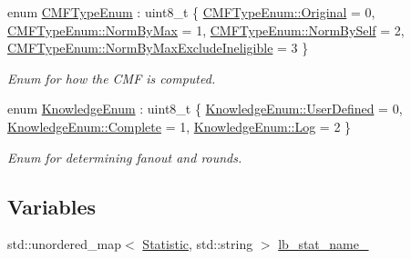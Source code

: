 \begin{DoxyCompactItemize}
enum \hyperlink{namespacevt_1_1vrt_1_1collection_1_1lb_ada1e381e6b19ba9f8277d4f698445404}{C\+M\+F\+Type\+Enum} \+: uint8\+\_\+t \{ \hyperlink{namespacevt_1_1vrt_1_1collection_1_1lb_ada1e381e6b19ba9f8277d4f698445404a0a52da7a03a6de3beefe54f8c03ad80d}{C\+M\+F\+Type\+Enum\+::\+Original} = 0, 
\hyperlink{namespacevt_1_1vrt_1_1collection_1_1lb_ada1e381e6b19ba9f8277d4f698445404a2a17cd13e37fb3cacfea703c5edc3680}{C\+M\+F\+Type\+Enum\+::\+Norm\+By\+Max} = 1, 
\hyperlink{namespacevt_1_1vrt_1_1collection_1_1lb_ada1e381e6b19ba9f8277d4f698445404a538edd88c8c3085ee0ee4337f25bc296}{C\+M\+F\+Type\+Enum\+::\+Norm\+By\+Self} = 2, 
\hyperlink{namespacevt_1_1vrt_1_1collection_1_1lb_ada1e381e6b19ba9f8277d4f698445404abaf94565ded5ad030ec19a9c5ab07d95}{C\+M\+F\+Type\+Enum\+::\+Norm\+By\+Max\+Exclude\+Ineligible} = 3
 \}\begin{DoxyCompactList}\small\item\em Enum for how the C\+MF is computed. \end{DoxyCompactList}
\item 
enum \hyperlink{namespacevt_1_1vrt_1_1collection_1_1lb_a72b44c7e6b2052509331d57b9c94c84a}{Knowledge\+Enum} \+: uint8\+\_\+t \{ \hyperlink{namespacevt_1_1vrt_1_1collection_1_1lb_a72b44c7e6b2052509331d57b9c94c84aac90d702da275c4b81b75a6a0163bc2bf}{Knowledge\+Enum\+::\+User\+Defined} = 0, 
\hyperlink{namespacevt_1_1vrt_1_1collection_1_1lb_a72b44c7e6b2052509331d57b9c94c84aaae94f80b3ce82062a5dd7815daa04f9d}{Knowledge\+Enum\+::\+Complete} = 1, 
\hyperlink{namespacevt_1_1vrt_1_1collection_1_1lb_a72b44c7e6b2052509331d57b9c94c84aace0be71e33226e4c1db2bcea5959f16b}{Knowledge\+Enum\+::\+Log} = 2
 \}\begin{DoxyCompactList}\small\item\em Enum for determining fanout and rounds. \end{DoxyCompactList}
\end{DoxyCompactItemize}
\subsection*{Variables}
\begin{DoxyCompactItemize}
\item 
std\+::unordered\+\_\+map$<$ \hyperlink{namespacevt_1_1vrt_1_1collection_1_1lb_af0e20ef9afee77295053aa83bf1348b1}{Statistic}, std\+::string $>$ \hyperlink{namespacevt_1_1vrt_1_1collection_1_1lb_a93087d8eb275a6113b9d32e41ef87277}{lb\+\_\+stat\+\_\+name\+\_\+}
\end{DoxyCompactItemize}


